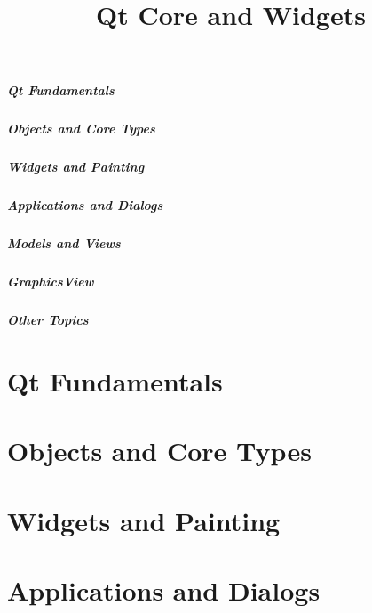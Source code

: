 \documentclass[t]{beamer}
\title{Qt Core and Widgets}
\begin{document}


\setcounter{tocdepth}{2} %
\begin{frame}
  \frametitle{Qt Fundamentals}
  \tableofcontents[part=1]
  \vspace{108pt}
\end{frame}

\begin{frame}
  \frametitle{Objects and Core Types}
  \tableofcontents[part=2]
\end{frame}

\begin{frame}
  \frametitle{Widgets and Painting}
  \tableofcontents[part=3]
\end{frame}

\begin{frame}
  \frametitle{Applications and Dialogs}
  \tableofcontents[part=4]
\end{frame}

\begin{frame}
  \frametitle{Models and Views}
  \tableofcontents[part=5]
\end{frame}

\begin{frame}
  \frametitle{GraphicsView}
  \tableofcontents[part=6]
\end{frame}

\begin{frame}
  \frametitle{Other Topics}
  \tableofcontents[part=7]
\end{frame}


\setcounter{tocdepth}{3} %

\part{Qt Fundamentals}


\part{Objects and Core Types}




\part{Widgets and Painting}



\part{Applications and Dialogs}


\end{document}

